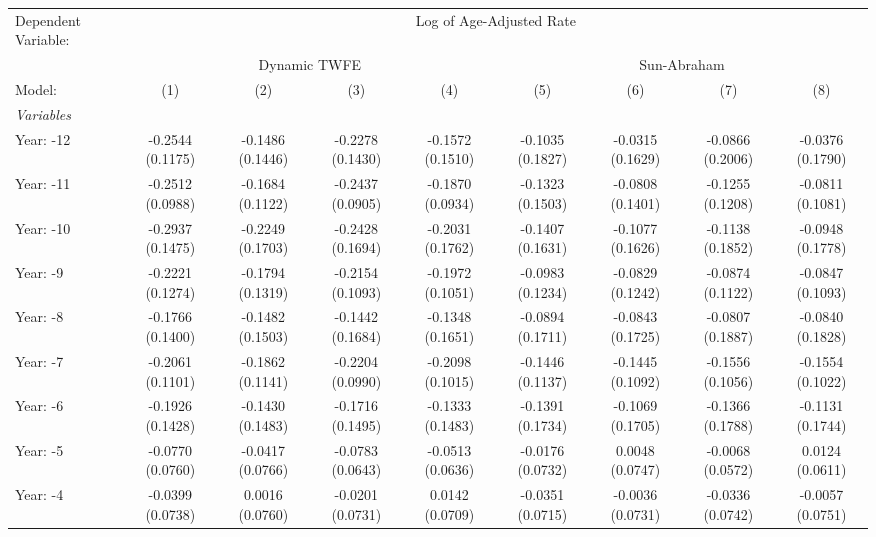 
\begingroup
\centering
\tiny
\begin{tabular}{lcccccccc}
   \tabularnewline \midrule \midrule
   Dependent Variable: & \multicolumn{8}{c}{Log of Age-Adjusted Rate}\\
    & \multicolumn{4}{c}{Dynamic TWFE} & \multicolumn{4}{c}{Sun-Abraham} \\ 
   Model:                              & (1)              & (2)              & (3)              & (4)              & (5)              & (6)              & (7)              & (8)\\  
   \midrule
   \emph{Variables}\\
   Year: -12                           & -0.2544 (0.1175) & -0.1486 (0.1446) & -0.2278 (0.1430) & -0.1572 (0.1510) & -0.1035 (0.1827) & -0.0315 (0.1629) & -0.0866 (0.2006) & -0.0376 (0.1790)\\   
   Year: -11                           & -0.2512 (0.0988) & -0.1684 (0.1122) & -0.2437 (0.0905) & -0.1870 (0.0934) & -0.1323 (0.1503) & -0.0808 (0.1401) & -0.1255 (0.1208) & -0.0811 (0.1081)\\   
   Year: -10                           & -0.2937 (0.1475) & -0.2249 (0.1703) & -0.2428 (0.1694) & -0.2031 (0.1762) & -0.1407 (0.1631) & -0.1077 (0.1626) & -0.1138 (0.1852) & -0.0948 (0.1778)\\   
   Year: -9                            & -0.2221 (0.1274) & -0.1794 (0.1319) & -0.2154 (0.1093) & -0.1972 (0.1051) & -0.0983 (0.1234) & -0.0829 (0.1242) & -0.0874 (0.1122) & -0.0847 (0.1093)\\   
   Year: -8                            & -0.1766 (0.1400) & -0.1482 (0.1503) & -0.1442 (0.1684) & -0.1348 (0.1651) & -0.0894 (0.1711) & -0.0843 (0.1725) & -0.0807 (0.1887) & -0.0840 (0.1828)\\   
   Year: -7                            & -0.2061 (0.1101) & -0.1862 (0.1141) & -0.2204 (0.0990) & -0.2098 (0.1015) & -0.1446 (0.1137) & -0.1445 (0.1092) & -0.1556 (0.1056) & -0.1554 (0.1022)\\   
   Year: -6                            & -0.1926 (0.1428) & -0.1430 (0.1483) & -0.1716 (0.1495) & -0.1333 (0.1483) & -0.1391 (0.1734) & -0.1069 (0.1705) & -0.1366 (0.1788) & -0.1131 (0.1744)\\   
   Year: -5                            & -0.0770 (0.0760) & -0.0417 (0.0766) & -0.0783 (0.0643) & -0.0513 (0.0636) & -0.0176 (0.0732) & 0.0048 (0.0747)  & -0.0068 (0.0572) & 0.0124 (0.0611)\\   
   Year: -4                            & -0.0399 (0.0738) & 0.0016 (0.0760)  & -0.0201 (0.0731) & 0.0142 (0.0709)  & -0.0351 (0.0715) & -0.0036 (0.0731) & -0.0336 (0.0742) & -0.0057 (0.0751)\\   

\end{tabular}
